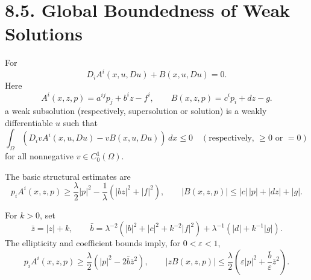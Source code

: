\section*{8.5. Global Boundedness of Weak Solutions}

For
\begin{equation}
D_iA^i(x,u,Du)+B(x,u,Du)=0.
\tag{8.28}
\end{equation}
Here
\begin{equation}
A^i(x,z,p)=a^{ij}p_j+b^iz-f^i,
\qquad B(x,z,p)=c^ip_i+dz-g.
\tag{8.29}
\end{equation}
a weak subsolution (respectively, supersolution or solution) is a weakly
differentiable $u$ such that
\begin{equation}
\int_\Omega(D_ivA^i(x,u,Du)-vB(x,u,Du))\,dx\leq0
\quad(\text{respectively, }\geq0\text{ or }=0)
\tag{8.30}
\end{equation}
for all nonnegative $v\in C_0^1(\Omega)$.

The basic structural estimates are
\begin{equation}
p_iA^i(x,z,p)\geq\frac\lambda2|p|^2
-\frac1\lambda(|bz|^2+|f|^2),
\qquad
|B(x,z,p)|\leq|c|\,|p|+|dz|+|g|.
\tag{8.31}
\end{equation}

For $k>0$, set
\begin{equation}
\bar z=|z|+k,
\qquad
\bar b=\lambda^{-2}(|b|^2+|c|^2+k^{-2}|f|^2)
 +\lambda^{-1}(|d|+k^{-1}|g|).
\tag{8.32}
\end{equation}
The ellipticity and coefficient bounds imply, for $0<\varepsilon<1$,
\begin{equation}
p_iA^i(x,z,p)\geq\frac\lambda2(|p|^2-2\bar b\bar z^2),
\qquad
|zB(x,z,p)|\leq\frac\lambda2
\left(\varepsilon|p|^2+\frac{\bar b}{\varepsilon}\bar z^2\right).
\tag{8.33}
\end{equation}

